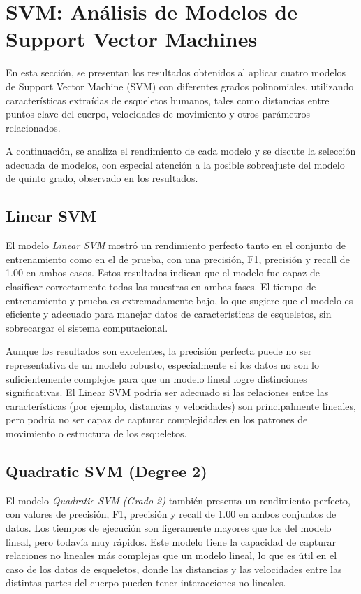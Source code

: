 \section{SVM: Análisis de Modelos de Support Vector Machines}

En esta sección, se presentan los resultados obtenidos al aplicar cuatro modelos de Support Vector Machine (SVM) con diferentes grados polinomiales, utilizando características extraídas de esqueletos humanos, tales como distancias entre puntos clave del cuerpo, velocidades de movimiento y otros parámetros relacionados.



A continuación, se analiza el rendimiento de cada modelo y se discute la selección adecuada de modelos, con especial atención a la posible sobreajuste del modelo de quinto grado, observado en los resultados.

\subsection{Linear SVM}
El modelo \textit{Linear SVM} mostró un rendimiento perfecto tanto en el conjunto de entrenamiento como en el de prueba, con una precisión, F1, precisión y recall de 1.00 en ambos casos. Estos resultados indican que el modelo fue capaz de clasificar correctamente todas las muestras en ambas fases. El tiempo de entrenamiento y prueba es extremadamente bajo, lo que sugiere que el modelo es eficiente y adecuado para manejar datos de características de esqueletos, sin sobrecargar el sistema computacional.

Aunque los resultados son excelentes, la precisión perfecta puede no ser representativa de un modelo robusto, especialmente si los datos no son lo suficientemente complejos para que un modelo lineal logre distinciones significativas. El Linear SVM podría ser adecuado si las relaciones entre las características (por ejemplo, distancias y velocidades) son principalmente lineales, pero podría no ser capaz de capturar complejidades en los patrones de movimiento o estructura de los esqueletos.

\subsection{Quadratic SVM (Degree 2)}
El modelo \textit{Quadratic SVM (Grado 2)} también presenta un rendimiento perfecto, con valores de precisión, F1, precisión y recall de 1.00 en ambos conjuntos de datos. Los tiempos de ejecución son ligeramente mayores que los del modelo lineal, pero todavía muy rápidos. Este modelo tiene la capacidad de capturar relaciones no lineales más complejas que un modelo lineal, lo que es útil en el caso de los datos de esqueletos, donde las distancias y las velocidades entre las distintas partes del cuerpo pueden tener interacciones no lineales.

